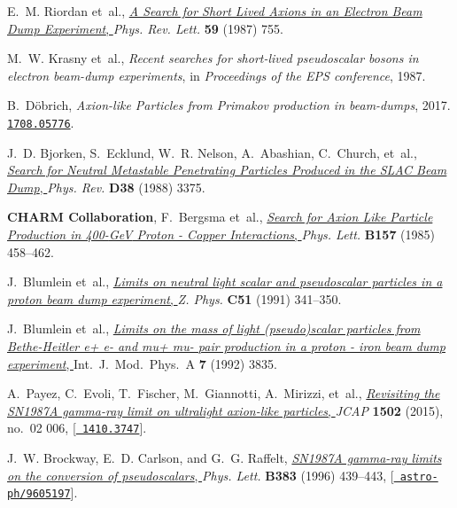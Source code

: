 \documentclass[11pt,a4paper]{article}
\begin{document}
\begin{thebibliography}{10}
E.~M. Riordan et~al., \href{http://dx.doi.org/10.1103/PhysRevLett.59.755}{{\it
  {A Search for Short Lived Axions in an Electron Beam Dump Experiment}}, }
  {\em Phys. Rev. Lett.} {\bf 59} (1987) 755.

M.~W. Krasny et~al., {\it {Recent searches for short-lived pseudoscalar bosons
  in electron beam-dump experiments}},  in {\em {Proceedings of the EPS
  conference}}, 1987.

B.~D{\"o}brich, {\it {Axion-like Particles from Primakov production in
  beam-dumps}},  2017.
\newblock \href{http://arxiv.org/abs/1708.05776}{{\tt 1708.05776}}.

J.~D. Bjorken, S.~Ecklund, W.~R. Nelson, A.~Abashian, C.~Church, et~al.,
  \href{http://dx.doi.org/10.1103/PhysRevD.38.3375}{{\it {Search for Neutral
  Metastable Penetrating Particles Produced in the SLAC Beam Dump}}, } {\em
  Phys. Rev.} {\bf D38} (1988) 3375.

{\bf CHARM Collaboration}, F.~Bergsma et~al.,
  \href{http://dx.doi.org/10.1016/0370-2693(85)90400-9}{{\it {Search for Axion
  Like Particle Production in 400-{GeV} Proton - Copper Interactions}}, } {\em
  Phys. Lett.} {\bf B157} (1985) 458--462.

J.~Blumlein et~al., \href{http://dx.doi.org/10.1007/BF01548556}{{\it {Limits on
  neutral light scalar and pseudoscalar particles in a proton beam dump
  experiment}}, } {\em Z. Phys.} {\bf C51} (1991) 341--350.
  
J.~Blumlein et~al., \href{http://dx.doi.org/10.1142/S0217751X9200171X}{{\it {Limits on the mass of light (pseudo)scalar particles from Bethe-Heitler e+ e- and mu+ mu- pair production in a proton - iron beam dump experiment}}, } Int.\ J.\ Mod.\ Phys.\ A {\bf 7} (1992) 3835.

A.~Payez, C.~Evoli, T.~Fischer, M.~Giannotti, A.~Mirizzi, et~al.,
  \href{http://dx.doi.org/10.1088/1475-7516/2015/02/006}{{\it {Revisiting the
  SN1987A gamma-ray limit on ultralight axion-like particles}}, } {\em JCAP}
  {\bf 1502} (2015), no.~02 006, [\href{http://arxiv.org/abs/1410.3747}{{\tt
  1410.3747}}].

J.~W. Brockway, E.~D. Carlson, and G.~G. Raffelt,
  \href{http://dx.doi.org/10.1016/0370-2693(96)00778-2}{{\it {SN1987A gamma-ray
  limits on the conversion of pseudoscalars}}, } {\em Phys. Lett.} {\bf B383}
  (1996) 439--443, [\href{http://arxiv.org/abs/astro-ph/9605197}{{\tt
  astro-ph/9605197}}].


\end{thebibliography}
\end{document}
